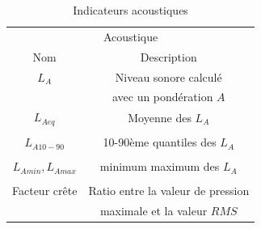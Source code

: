 \begin{table}[t]
\centering
\begin{tabular}{c c} 
\multicolumn{2}{c}{Acoustique} \\ 
Nom                           & Description            \\                                                            
\hline
$L_{A}$                                   & Niveau sonore calculé      \\
                                          & avec un pondération $A$\\
$L_{Aeq}$                                 & Moyenne des $L_A$     \\
                                          &         \\
$L_{A10-90}$                              & 10-90ème quantiles des $L_A$     \\
                                          &         \\
$L_{Amin}, L_{Amax}$                      & minimum maximum des $L_A$    \\
                                          &         \\
Facteur crête                             & Ratio entre la valeur de pression     \\
                                          & maximale et la valeur $RMS$        \\                                          
\hline
\end{tabular}
\vspace{0.5mm}
\caption{ Indicateurs acoustiques}
\label{tab:acousIndi}
\end{table}

